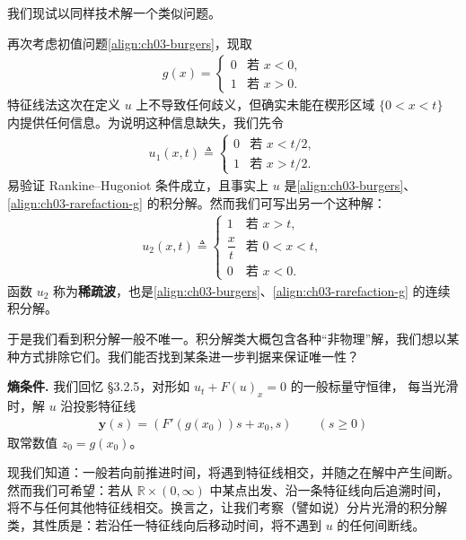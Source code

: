 \documentclass[../../main.tex]{subfiles}
\begin{document}
我们现试以同样技术解一个类似问题。

\begin{example}[稀疏波与非物理激波]\label{example:ch03-rarefaction}再次考虑初值问题\eqref{align:ch03-burgers}，现取
\begin{align}\label{align:ch03-rarefaction-g}
g(x)=
\begin{cases}
0 & \text{若 }x<0,\\
1 & \text{若 }x>0.
\end{cases}
\end{align}
特征线法这次在定义 $u$ 上不导致任何歧义，但确实未能在楔形区域 $\{0<x<t\}$ 内提供任何信息。为说明这种信息缺失，我们先令
\begin{align*}
u_1(x,t)\triangleq
\begin{cases}
0 & \text{若 }x<t/2,\\
1 & \text{若 }x>t/2.
\end{cases}
\end{align*}
易验证 Rankine--Hugoniot 条件成立，且事实上 $u$ 是\eqref{align:ch03-burgers}、\eqref{align:ch03-rarefaction-g} 的积分解。然而我们可写出另一个这种解：
\begin{align*}
u_2(x,t)\triangleq
\begin{cases}
1 & \text{若 }x>t,\\
\dfrac{x}{t} & \text{若 }0<x<t,\\
0 & \text{若 }x<0.
\end{cases}
\end{align*}
函数 $u_2$ 称为\textbf{稀疏波}，也是\eqref{align:ch03-burgers}、\eqref{align:ch03-rarefaction-g} 的连续积分解。
\end{example}

于是我们看到积分解一般不唯一。积分解类大概包含各种``非物理''解，我们想以某种方式排除它们。我们能否找到某条进一步判据来保证唯一性？

\textbf{熵条件.} 我们回忆 \S3.2.5，对形如 $u_t+F(u)_x=0$ 的一般标量守恒律，
每当光滑时，解 $u$ 沿投影特征线
\begin{align}\label{align:ch03-char-proj}
\mathbf{y}(s)=(F'(g(x_0))s+x_0,s) \qquad(s\geqslant 0)
\end{align}
取常数值 $z_0=g(x_0)$。

现我们知道：一般若向前推进时间，将遇到特征线相交，并随之在解中产生间断。然而我们可希望：若从 $\mathbb{R}\times(0,\infty)$ 中某点出发、沿一条特征线向后追溯时间，将不与任何其他特征线相交。换言之，让我们考察（譬如说）分片光滑的积分解类，其性质是：若沿任一特征线向后移动时间，将不遇到 $u$ 的任何间断线。
\end{document}
